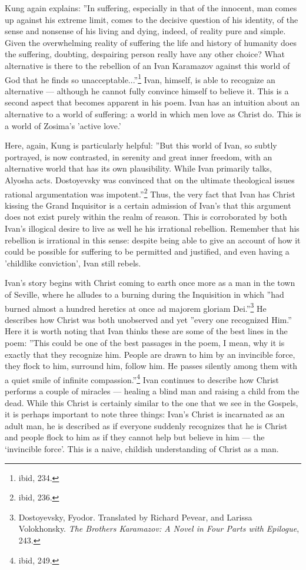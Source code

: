 Kung again explains: ''In suffering, especially in that of the innocent, man comes up against his extreme limit, comes to the decisive question of his identity, of the sense and nonsense of his living and dying, indeed, of reality pure and simple. Given the overwhelming reality of suffering the life and history of humanity does the suffering, doubting, despairing person really have any other choice? What alternative is there to the rebellion of an Ivan Karamazov against this world of God that he finds so unacceptable...''\footnote{ibid, 234.} Ivan, himself, is able to recognize an alternative --- although he cannot fully convince himself to believe it. This is a second aspect that becomes apparent in his poem. Ivan has an intuition about an alternative to a world of suffering: a world in which men love as Christ do. This is a world of Zosima's 'active love.'

Here, again, Kung is particularly helpful: ''But this world of Ivan, so subtly portrayed, is now contrasted, in serenity and great inner freedom, with an alternative world that has its own plausibility. While Ivan primarily talks, Alyosha acts. Dostoyevsky was convinced that on the ultimate theological issues rational argumentation was impotent.''\footnote{ibid, 236.} Thus, the very fact that Ivan has Christ kissing the Grand Inquisitor is a certain admission of Ivan's that this argument does not exist purely within the realm of reason. This is corroborated by both Ivan's illogical desire to live as well he his irrational rebellion. Remember that his rebellion is irrational in this sense: despite being able to give an account of how it could be possible for suffering to be permitted and justified, and even having a 'childlike conviction', Ivan still rebels.

Ivan's story begins with Christ coming to earth once more as a man in the town of Seville, where he alludes to a burning during the Inquisition in which ''had burned almost a hundred heretics at once ad majorem gloriam Dei.''\footnote{Dostoyevsky, Fyodor. Translated by Richard Pevear, and Larissa Volokhonsky. \emph{The Brothers Karamazov: A Novel in Four Parts with Epilogue}, 243.} He describes how Christ was both unobserved and yet ''every one recognized Him.'' Here it is worth noting that Ivan thinks these are some of the best lines in the poem: ''This could be one of the best passages in the poem, I mean, why it is exactly that they recognize him. People are drawn to him by an invincible force, they flock to him, surround him, follow him. He passes silently among them with a quiet smile of infinite compassion.''\footnote{ibid, 249.} Ivan continues to describe how Christ performs a couple of miracles --- healing a blind man and raising a child from the dead. While this Christ is certainly similar to the one that we see in the Gospels, it is perhaps important to note three things: Ivan's Christ is incarnated as an adult man, he is described as if everyone suddenly recognizes that he is Christ and people flock to him as if they cannot help but believe in him --- the `invincible force'. This is a naive, childish understanding of Christ as a man.

